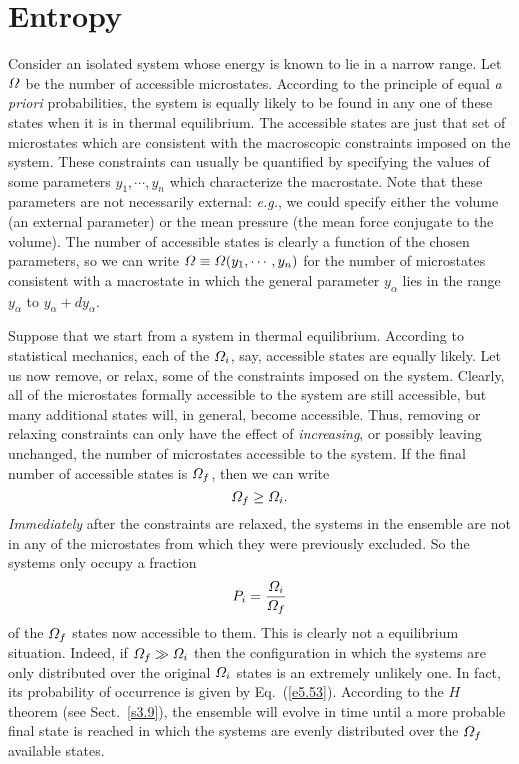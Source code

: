 \section{Entropy}\label{s5.6}
Consider an isolated system whose energy is known to lie in a narrow range.
Let ${\mit\Omega}$ be the number of accessible microstates. According to the principle
of equal {\em a priori}\/ probabilities,  the system is equally likely
to be found in any one of these states when it is in
thermal equilibrium. The accessible states are just that set
of microstates which are consistent with the macroscopic constraints imposed on the
system. These constraints can usually be quantified by specifying the values
of some parameters  $y_1, \cdots, y_n$ which characterize the
macrostate. Note that these parameters are not necessarily external: {\em e.g.},
 we could specify
either the volume (an external parameter) or the mean pressure 
(the mean force conjugate to the volume).
The number of accessible states is clearly a function of the chosen
parameters, so we can write ${\mit\Omega}\equiv {\mit\Omega}(y_1,\cdots, y_n)$ for the number of
microstates consistent with a macrostate in which the general parameter 
$y_\alpha$ lies in the range $y_\alpha$ to $y_\alpha+d y_\alpha$.

Suppose that we start from a system in thermal equilibrium.
According to statistical mechanics,  each of the ${\mit\Omega}_i$,
say, accessible states are equally likely. Let us now remove, or relax, some of the
constraints imposed on the system. Clearly, all of the microstates formally 
accessible to the system are still accessible, but many additional states will,
in general, become accessible. Thus, removing or relaxing constraints can only have
the effect of {\em increasing}, or possibly leaving unchanged, the number of
microstates accessible to the system. If the final number of accessible states
is ${\mit\Omega}_f$, then we can write
\begin{equation}
{\mit\Omega}_f \geq {\mit\Omega}_i.
\end{equation}
{\em Immediately}\/ after the constraints are relaxed, the systems in the ensemble
 are
not in any of the microstates from which they were previously excluded. So the
systems only occupy a fraction
\begin{equation}
P_i =\frac{{\mit\Omega}_i}{{\mit\Omega}_f}\label{e5.53}
\end{equation}
of the ${\mit\Omega}_f$ states now accessible to them. This is clearly not a equilibrium
situation. Indeed, if ${\mit\Omega}_f\gg {\mit\Omega}_i$ then the configuration 
in which  the systems
are only distributed over the original ${\mit\Omega}_i$ states is an extremely unlikely
one.
In fact, its probability of occurrence is given by Eq.~(\ref{e5.53}). According to the
$H$ theorem (see Sect.~\ref{s3.9}), the ensemble will evolve in time until a more probable
final state is reached in
which the systems are evenly distributed  over the ${\mit\Omega}_f$
available states.


